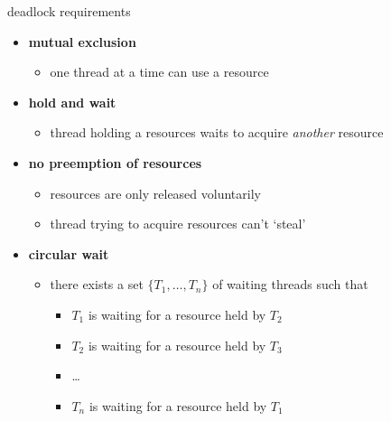 \begin{frame}{deadlock requirements}
\begin{itemize}
\item \textbf{mutual exclusion}
    \begin{itemize}
    \item one thread at a time can use a resource
    \end{itemize}
\item \textbf{hold and wait}
  \begin{itemize}
  \item thread holding a resources waits to acquire \textit{another} resource
  \end{itemize}
\item \textbf{no preemption of resources}
    \begin{itemize}
    \item resources are only released voluntarily
    \item thread trying to acquire resources can't `steal'
    \end{itemize}
\item \textbf{circular wait}
    \begin{itemize}
    \item there exists a set $\{T_1,\ldots,T_n\}$ of waiting threads such that
        \begin{itemize}
        \item $T_1$ is waiting for a resource held by $T_2$
        \item $T_2$ is waiting for a resource held by $T_3$
        \item \ldots
        \item $T_n$ is waiting for a resource held by $T_1$
        \end{itemize}
    \end{itemize}
\end{itemize}
\end{frame}
